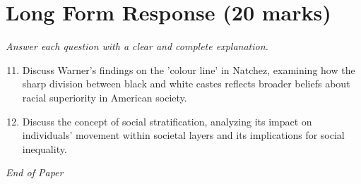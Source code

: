 \documentclass[12pt]{article}
\begin{document}
\section*{Long Form Response (20 marks)}
\textit{Answer each question with a clear and complete explanation.}
\begin{enumerate}[label=\arabic*.]
\setcounter{enumi}{10}
\item Discuss Warner's findings on the 'colour line' in Natchez, examining how the sharp division between black and white castes reflects broader beliefs about racial superiority in American society.
\item Discuss the concept of social stratification, analyzing its impact on individuals' movement within societal layers and its implications for social inequality.
\end{enumerate}

\vfill
\noindent\textit{End of Paper}
\end{document}
